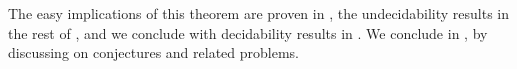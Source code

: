 The easy implications of this theorem are proven in ,
the undecidability results in the rest of ,
and we conclude with decidability results in .
We conclude in , by discussing on
conjectures and related problems.

